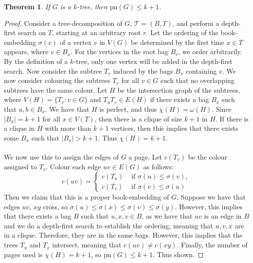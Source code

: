 \documentclass[]{article}
\newcommand{\tree}{\mathcal{T}}
\newcommand{\pn}{\text{pn}}
\newtheorem{theorem}{Theorem}
\theoremstyle{definition}
\numberwithin{theorem}{section}
\numberwithin{equation}{section}
\begin{document}
\begin{theorem}
	If $G$ is a $k$-tree, then $\pn(G) \leq k + 1$. 
\end{theorem}
\begin{proof}
	Consider a tree-decomposition of $G$, $\tree = (B, T)$, and perform a depth-first search on $T$, starting at an arbitrary root $r$. Let the ordering of the book-embedding $\sigma(v)$ of a vertex $v$ in $V(G)$ be determined by the first time $x \in T$ appears, where $v \in B_x$. For the vertices in the root bag $B_r$, we order arbitrarily. By the definition of a $k$-tree, only one vertex will be added in the depth-first search. Now consider the subtree $T_v$ induced by the bags $B_x$ containing $v$. We now consider colouring the subtrees $T_v$ for all $v \in G$ such that no overlapping subtrees have the same colour. Let $H$ be the intersection graph of the subtrees, where $V(H) = \lbrace T_v : v \in G \rbrace$ and $T_u T_v \in E(H)$ if there exists a bag $B_x$ such that $u, b \in B_x$. We have that $H$ is perfect, and thus $\chi(H) = \omega(H)$. Since $|B_x| = k + 1$ for all $x \in V(T)$, then there is a clique of size $k + 1$ in $H$. If there is a clique in $H$ with more than $k+ 1$ vertices, then this implies that there exists some $B_x$ such that $|B_x| > k + 1$. Thus $\chi(H) = k + 1$. 
	\paragraph{}
	We now use this to assign the edges of $G$ a page. Let $c(T_v)$ be the colour assigned to $T_v$. Colour each edge $uv \in E(G)$ as follows:
	\begin{equation}
		c(uv) = 
		\begin{cases}
			c(T_u) &\text{ if } \sigma(u) \leq \sigma(v),\\
			c(T_v) &\text{ if } \sigma(v) \leq \sigma(u)
		\end{cases}
	\end{equation}
	Then we claim that this is a proper book-embedding of $G$. Suppose we have that edges $uv$, $xy$ cross, so $\sigma(u) \leq \sigma(x) \leq \sigma(v) \leq \sigma(y)$. However, this implies that there exists a bag $B$ such that $u, x, v \in B$, as we have that $uv$ is an edge in $B$ and we do a depth-first search to establish the ordering, meaning that $u, v, x$ are in a clique. Therefore, they are in the same bags. However, this implies that the trees $T_u$ and $T_x$ intersect, meaning that $c(uv) \neq c(xy)$. Finally, the number of pages used is $\chi(H) = k + 1$, so $\pn(G) \leq k + 1$. Thus shown.
\end{proof}
\end{document}

